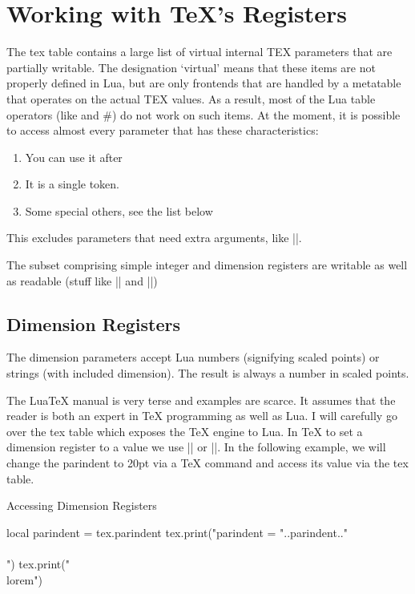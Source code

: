 \chapter{Working with TeX's Registers}


The tex table contains a large list of virtual internal TEX parameters that are partially writable.
The designation ‘virtual’ means that these items are not properly defined in Lua, but are only
frontends that are handled by a metatable that operates on the actual TEX values. As a result,
most of the Lua table operators (like  and \#) do not work on such items.
At the moment, it is possible to access almost every parameter that has these characteristics:

\begin{enumerate}
\item You can use it after 

\item It is a single token.

\item Some special others, see the list below
\end{enumerate}

This excludes parameters that need extra arguments, like |\the\scriptfont|.

The subset comprising simple integer and dimension registers are writable as well as readable
(stuff like |\tracingcommands| and |\parindent|)

\section{Dimension Registers}

The dimension parameters accept Lua numbers (signifying scaled points) or strings (with included dimension). The result is always a number in scaled points.

The LuaTeX manual is very terse and examples are scarce. It assumes that the reader is both an expert in TeX programming as well as Lua. I will carefully go over the tex table which exposes the TeX engine to Lua. In TeX to set a dimension register to a value we use |\parindent=10pt| or |\parindent0pt|. In the following example, we will change the parindent to 20pt via a TeX command and access its value via the tex table.

\begin{texexample}{Accessing Dimension Registers}{}
\begingroup
\parindent20pt
\begin{luacode}
local parindent = tex.parindent
tex.print("parindent = "..parindent.."\\\\")  
tex.print("\\lorem")  
\end{luacode}
\endgroup
\end{texexample}

